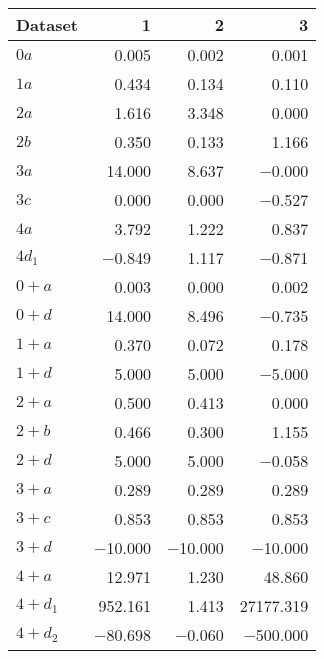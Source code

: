 \begin{tabular}{lrrr}
\toprule
 Dataset   &       1 &       2 &         3 \\
\midrule
 $0 a$     &   \num{0.005} &   \num{0.002} &     \num{0.001} \\
 $1 a$     &   \num{0.434} &   \num{0.134} &     \num{0.110} \\
 $2 a$     &   \num{1.616} &   \num{3.348} &     \num{0.000} \\
 $2 b$     &   \num{0.350} &   \num{0.133} &     \num{1.166} \\
 $3 a$     &  \num{14.000} &   \num{8.637} &    \num{-0.000} \\
 $3 c$     &   \num{0.000} &   \num{0.000} &    \num{-0.527} \\
 $4 a$     &   \num{3.792} &   \num{1.222} &     \num{0.837} \\
 $4 d_1$   &  \num{-0.849} &   \num{1.117} &    \num{-0.871} \\
 $0+ a$    &   \num{0.003} &   \num{0.000} &     \num{0.002} \\
 $0+ d$    &  \num{14.000} &   \num{8.496} &    \num{-0.735} \\
 $1+ a$    &   \num{0.370} &   \num{0.072} &     \num{0.178} \\
 $1+ d$    &   \num{5.000} &   \num{5.000} &    \num{-5.000} \\
 $2+ a$    &   \num{0.500} &   \num{0.413} &     \num{0.000} \\
 $2+ b$    &   \num{0.466} &   \num{0.300} &     \num{1.155} \\
 $2+ d$    &   \num{5.000} &   \num{5.000} &    \num{-0.058} \\
 $3+ a$    &   \num{0.289} &   \num{0.289} &     \num{0.289} \\
 $3+ c$    &   \num{0.853} &   \num{0.853} &     \num{0.853} \\
 $3+ d$    & \num{-10.000} & \num{-10.000} &   \num{-10.000} \\
 $4+ a$    &  \num{12.971} &   \num{1.230} &    \num{48.860} \\
 $4+ d_1$  & \num{952.161} &   \num{1.413} & \num{27177.319} \\
 $4+ d_2$  & \num{-80.698} &  \num{-0.060} &  \num{-500.000} \\
\bottomrule
\end{tabular}